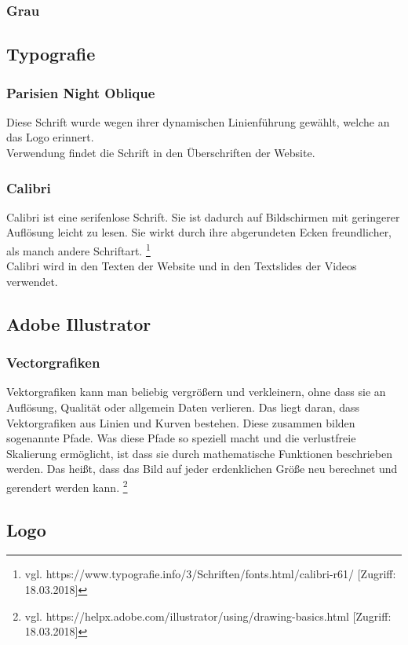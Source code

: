 \subsubsection{Grau}
\subsection{Typografie}
\subsubsection{Parisien Night Oblique}
Diese Schrift wurde wegen ihrer dynamischen Linienführung gewählt, welche an das Logo erinnert.
\\
Verwendung findet die Schrift in den Überschriften der Website.

\subsubsection{Calibri}
Calibri ist eine serifenlose Schrift. Sie ist dadurch auf Bildschirmen mit geringerer Auflösung leicht zu lesen. Sie wirkt durch ihre abgerundeten Ecken freundlicher, als manch andere Schriftart. \footnote{\label{} vgl. https://www.typografie.info/3/Schriften/fonts.html/calibri-r61/ [Zugriff: 18.03.2018]}
\\
Calibri wird in den Texten der Website und in den Textslides der Videos verwendet.

\subsection{Adobe Illustrator}
\subsubsection{Vectorgrafiken}
Vektorgrafiken kann man beliebig vergrößern und verkleinern, ohne dass sie an Auflösung, Qualität oder allgemein Daten verlieren. Das liegt daran, dass Vektorgrafiken aus Linien und Kurven bestehen. Diese zusammen bilden sogenannte Pfade. Was diese Pfade so speziell macht und die verlustfreie Skalierung ermöglicht, ist dass sie durch mathematische Funktionen beschrieben werden. Das heißt, dass das Bild auf jeder erdenklichen Größe neu berechnet und gerendert werden kann.
\footnote{\label{} vgl. https://helpx.adobe.com/illustrator/using/drawing-basics.html [Zugriff: 18.03.2018]}

\subsection{Logo}
